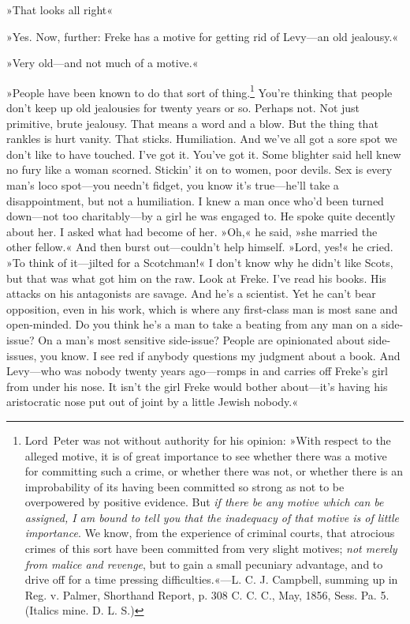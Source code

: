 »That looks all right\longdash«

»Yes. Now, further: Freke has a motive for getting rid of Levy—an old jealousy.«

»Very old—and not much of a motive.«

»People have been known to do that sort of thing.\footnote{Lord~Peter was not without authority for his opinion: »With respect to the alleged motive, it is of great importance to see whether there was a motive for committing such a crime, or whether there was not, or whether there is an improbability of its having been committed so strong as not to be overpowered by positive evidence. But \textit{if there be any motive which can be assigned, I am bound to tell you that the inadequacy of that motive is of little importance}. We know, from the experience of criminal courts, that atrocious crimes of this sort have been committed from very slight motives; \textit{not merely from malice and revenge}, but to gain a small pecuniary advantage, and to drive off for a time pressing difficulties.«—L\@. C\@. J\@. Campbell, summing up in Reg. v. Palmer, Shorthand Report, p. 308 C\@. C\@. C\@., May, 1856, Sess. Pa. 5. (Italics mine. D\@. L\@. S\@.)}	You're thinking that people don't keep up old jealousies for twenty years or so. Perhaps not. Not just primitive, brute jealousy. That means a word and a blow. But the thing that rankles is hurt vanity. That sticks. Humiliation. And we've all got a sore spot we don't like to have touched. I've got it. You've got it. Some blighter said hell knew no fury like a woman scorned. Stickin' it on to women, poor devils. Sex is every man's loco spot—you needn't fidget, you know it's true—he'll take a disappointment, but not a humiliation. I knew a man once who'd been turned down—not too charitably—by a girl he was engaged to. He spoke quite decently about her. I asked what had become of her. »Oh,« he said, »she married the other fellow.« And then burst out—couldn't help himself. »Lord, yes!« he cried. »To think of it—jilted for a Scotchman!« I don't know why he didn't like Scots, but that was what got him on the raw. Look at Freke. I've read his books. His attacks on his antagonists are savage. And he's a scientist. Yet he can't bear opposition, even in his work, which is where any first-class man is most sane and open-minded. Do you think he's a man to take a beating from any man on a side-issue? On a man's most sensitive side-issue? People are opinionated about side-issues, you know. I see red if anybody questions my judgment about a book. And Levy—who was nobody twenty years ago—romps in and carries off Freke's girl from under his nose. It isn't the girl Freke would bother about—it's having his aristocratic nose put out of joint by a little Jewish nobody.«

